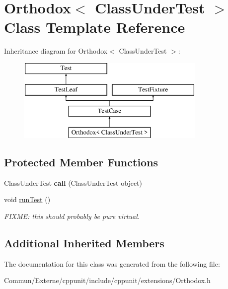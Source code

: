 \hypertarget{class_orthodox}{}\section{Orthodox$<$ Class\+Under\+Test $>$ Class Template Reference}
\label{class_orthodox}
Inheritance diagram for Orthodox$<$ Class\+Under\+Test $>$\+:\begin{figure}[H]
\begin{center}
\leavevmode
\includegraphics[height=4.000000cm]{class_orthodox}
\end{center}
\end{figure}
\subsection*{Protected Member Functions}
\begin{DoxyCompactItemize}
\item 
Class\+Under\+Test {\bfseries call} (Class\+Under\+Test object)\hypertarget{class_orthodox_a08e9feb769578cb7a8b92c7c2c5d1874}{}\label{class_orthodox_a08e9feb769578cb7a8b92c7c2c5d1874}

\item 
void \hyperlink{class_orthodox_aaeaafea272fdce3b5b2f33882cb33d8c}{run\+Test} ()\hypertarget{class_orthodox_aaeaafea272fdce3b5b2f33882cb33d8c}{}\label{class_orthodox_aaeaafea272fdce3b5b2f33882cb33d8c}

\begin{DoxyCompactList}\small\item\em F\+I\+X\+ME\+: this should probably be pure virtual. \end{DoxyCompactList}\end{DoxyCompactItemize}
\subsection*{Additional Inherited Members}


The documentation for this class was generated from the following file\+:\begin{DoxyCompactItemize}
\item 
Commun/\+Externe/cppunit/include/cppunit/extensions/Orthodox.\+h\end{DoxyCompactItemize}
